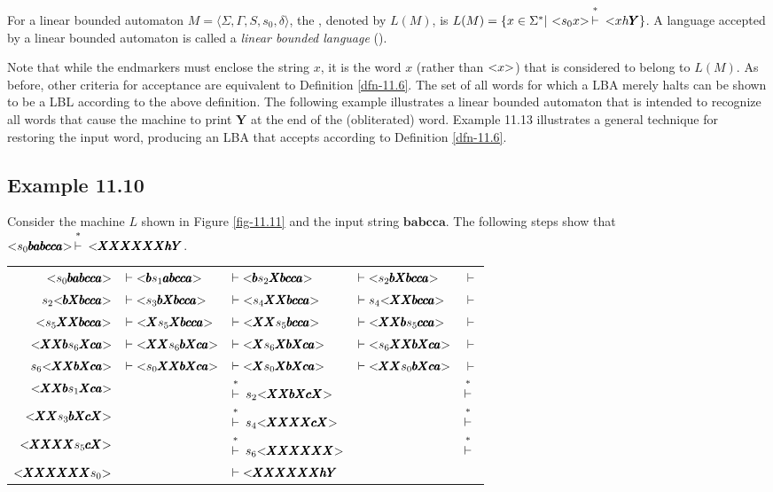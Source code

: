 \begin{dfn}\label{dfn-11.6}
For a linear bounded automaton $M=\langle\Sigma,\Gamma,S,s_0,\delta\rangle$, the
\emph{}, denoted by $L(M)$, is $L(M)=\{x\in
\Sigma^*|\ \<s_0x\>\Dvdash \<xh\pmb{Y}\}$. A language accepted by a linear bounded
automaton is called a \emph{linear bounded language} ().
\end{dfn}

Note that while the endmarkers must enclose the string $x$, it is the word $x$
(rather than $\text{\textless}x\text{\textgreater}$) that is considered to belong to $L(M)$. As before, other
criteria for acceptance are equivalent to Definition \ref{dfn-11.6}. The set of all words
for which a LBA merely halts can be shown to be a LBL according to the above
definition. The following example illustrates a linear bounded automaton that is
intended to recognize all words that cause the machine to print $\pmb{Y}$ at the
end of the (obliterated) word. Example 11.13 illustrates a general technique for
restoring the input word, producing an LBA that accepts according to Definition
\ref{dfn-11.6}.

\subsection*{Example 11.10}

Consider the machine $L$ shown in Figure \ref{fig-11.11} and the input string
$\pmb{babcca}$. The following steps show that $\<s_0\pmb{babcca}\>\Dvdash
\<\pmb{XXXXXXhY}$.
\begin{center}\begin{tabular}{r@{ }l@{ }l@{ }l@{ }l}
$\text{\textless}s_0\pmb{babcca}\text{\textgreater}$ & $\vdash \text{\textless}\pmb{b}s_1\pmb{abcca}\text{\textgreater}$ & $\vdash \text{\textless}\pmb{b}s_2
	\pmb{Xbcca}\text{\textgreater}$ & $\vdash \text{\textless}s_2\pmb{bXbcca}\text{\textgreater}$ & $\vdash$ \\
$s_2\text{\textless}\pmb{bXbcca}\text{\textgreater}$ & $\vdash \text{\textless}s_3\pmb{bXbcca}\text{\textgreater}$ & $\vdash \text{\textless}s_4\pmb{XXbcca}\text{\textgreater}$ &
	$\vdash s_4\text{\textless}\pmb{XXbcca}\text{\textgreater}$ & $\vdash$ \\
$\text{\textless}s_5\pmb{XXbcca}\text{\textgreater}$ & $\vdash \text{\textless}\pmb{X}s_5\pmb{Xbcca}\text{\textgreater}$ & $\vdash \text{\textless}\pmb{XX}s_5
	\pmb{bcca}\text{\textgreater}$ & $\vdash \text{\textless}\pmb{XXb}s_5\pmb{cca}\text{\textgreater}$ & $\vdash$ \\
$\text{\textless}\pmb{XXb}s_6\pmb{Xca}\text{\textgreater}$ & $\vdash \text{\textless}\pmb{XX}s_6\pmb{bXca}\text{\textgreater}$ & $\vdash \text{\textless}\pmb{X}
	s_6\pmb{XbXca}\text{\textgreater}$ & $\vdash \text{\textless}s_6\pmb{XXbXca}\text{\textgreater}$ & $\vdash$ \\
$s_6\text{\textless}\pmb{XXbXca}\text{\textgreater}$ & $\vdash \text{\textless}s_0\pmb{XXbXca}\text{\textgreater}$ & $\vdash \text{\textless}\pmb{X}s_0
	\pmb{XbXca}\text{\textgreater}$ & $\vdash \text{\textless}\pmb{XX}s_0\pmb{bXca}\text{\textgreater}$ & $\vdash$ \\
$\text{\textless}\pmb{XXb}s_1\pmb{Xca}\text{\textgreater}$ && $\Dvdash s_2\<\pmb{XXbXcX}\>$ && $\Dvdash$ \\
$\text{\textless}\pmb{XX}s_3\pmb{bXcX}\text{\textgreater}$ && $\Dvdash s_4\<\pmb{XXXXcX}\>$ && $\Dvdash$ \\
$\text{\textless}\pmb{XXXX}s_5\pmb{cX}\text{\textgreater}$ && $\Dvdash s_6\<\pmb{XXXXXX}\>$ && $\Dvdash$ \\
$\text{\textless}\pmb{XXXXXX}s_0\text{\textgreater}$ && $\vdash \text{\textless}\pmb{XXXXXXhY}$
\end{tabular}\end{center}

